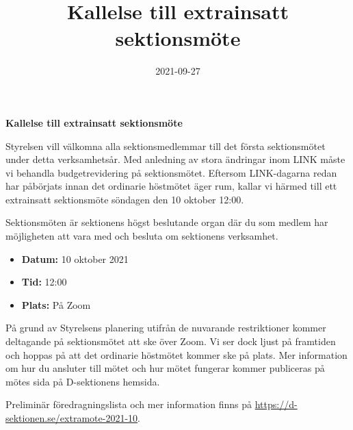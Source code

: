 \documentclass{datateknologsektionen-document}
\title{Kallelse till extrainsatt sektionsmöte}
\date{2021-09-27}
\begin{document}





\large
\begin{center}
  \vspace*{5mm}
  {\LARGE\bfseries Kallelse till extrainsatt sektionsmöte}
  \vspace{2mm}
\end{center}

Styrelsen vill välkomna alla sektionsmedlemmar till det första sektionsmötet under detta verksamhetsår. Med anledning av stora ändringar inom LINK måste vi behandla budgetrevidering på sektionsmötet. Eftersom LINK-dagarna redan har påbörjats innan det ordinarie höstmötet äger rum, kallar vi härmed till ett extrainsatt sektionsmöte söndagen den 10 oktober 12:00. 

Sektionsmöten är sektionens högst beslutande organ där du som medlem har möjligheten att vara med och besluta om sektionens verksamhet. 

\vspace*{4mm}
\begin{itemize}
  \item \textbf{Datum:} 10 oktober 2021
  \item \textbf{Tid:} 12:00
  \item \textbf{Plats:} På Zoom
\end{itemize}

På grund av Styrelsens planering utifrån de nuvarande restriktioner kommer deltagande på sektionsmötet att ske över Zoom. Vi ser dock ljust på framtiden och hoppas på att det ordinarie höstmötet kommer ske på plats. Mer information om hur du ansluter till mötet och hur mötet fungerar kommer publiceras på mötes sida på D-sektionens hemsida.

Preliminär föredragningslista och mer information finns på \url{https://d-sektionen.se/extramote-2021-10}.
\end{document}
